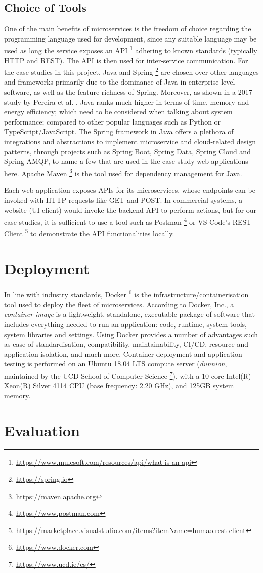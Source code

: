 \subsection{Choice of Tools}

One of the main benefits of microservices is the freedom of choice regarding the programming language used for development, since any suitable language may be used as long the service exposes an API \footnote{\url{https://www.mulesoft.com/resources/api/what-is-an-api}} adhering to known standards (typically HTTP and REST). The API is then used for inter-service communication. For the case studies in this project, Java and Spring \footnote{\url{https://spring.io}} are chosen over other languages and frameworks primarily due to the dominance of Java in enterprise-level software, as well as the feature richness of Spring. Moreover, as shown in a 2017 study by Pereira et al. \cite{pereira17}, Java ranks much higher in terms of time, memory and energy efficiency; which need to be considered when talking about system performance; compared to other popular languages such as Python or TypeScript/JavaScript. The Spring framework in Java offers a plethora of integrations and abstractions to implement microservice and cloud-related design patterns, through projects such as Spring Boot, Spring Data, Spring Cloud and Spring AMQP, to name a few that are used in the case study web applications here. Apache Maven \footnote{\url{https://maven.apache.org}} is the tool used for dependency management for Java.

Each web application exposes APIs for its microservices, whose endpoints can be invoked with HTTP requests like GET and POST. In commercial systems, a website (UI client) would invoke the backend API to perform actions, but for our case studies, it is sufficient to use a tool such as Postman \footnote{\url{https://www.postman.com}} or VS Code's REST Client \footnote{\url{https://marketplace.visualstudio.com/items?itemName=humao.rest-client}} to demonstrate the API functionalities locally.

\section{Deployment}

In line with industry standards, Docker \footnote{\url{https://www.docker.com}} is the infrastructure/containerisation tool used to deploy the fleet of microservices. According to Docker, Inc., a \textit{container image} is a lightweight, standalone, executable package of software that includes everything needed to run an application: code, runtime, system tools, system libraries and settings. Using Docker provides a number of advantages such as ease of standardisation, compatibility, maintainability, CI/CD, resource and application isolation, and much more. Container deployment and application testing is performed on an Ubuntu 18.04 LTS compute server (\textit{dunnion}, maintained by the UCD School of Computer Science \footnote{\url{https://www.ucd.ie/cs/}}), with a 10 core Intel(R) Xeon(R) Silver 4114 CPU (base frequency: 2.20 GHz), and 125GB system memory.

\section{Evaluation}